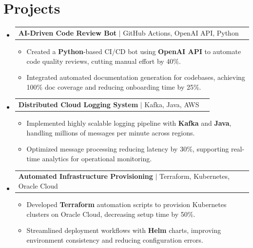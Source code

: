 \documentclass[letterpaper,11pt]{article}
\makeatletter
\newcommand{\resumeItem}[1]{
  \item\footnotesize{
    {#1 \vspace{-2pt}}
  }
}
\newcommand{\resumeProjectHeading}[2]{
    \item
    \begin{tabular*}{1.001\textwidth}{l@{\extracolsep{\fill}}r}
      \small#1 & \textbf{\small #2}\\
    \end{tabular*}\vspace{-7pt}
}
\newcommand{\resumeSubHeadingListStart}{\begin{itemize}[leftmargin=0pt, label={}]}
\newcommand{\resumeSubHeadingListEnd}{\end{itemize}}
\newcommand{\resumeItemListStart}{\begin{itemize}[leftmargin=*]}
\newcommand{\resumeItemListEnd}{\end{itemize}\vspace{-5pt}}
\makeatother
\begin{document}
\section{Projects}
    \vspace{-5pt}
    \resumeSubHeadingListStart
      \resumeProjectHeading
          {\textbf{AI-Driven Code Review Bot} $|$ GitHub Actions, OpenAI API, Python}{}
          \resumeItemListStart
              \resumeItem{Created a \textbf{Python}-based CI/CD bot using \textbf{OpenAI API} to automate code quality reviews, cutting manual effort by 40\%.}
              \resumeItem{Integrated automated documentation generation for codebases, achieving 100\% doc coverage and reducing onboarding time by 25\%.}
          \resumeItemListEnd
          \vspace{-12pt}
      \resumeProjectHeading
          {\textbf{Distributed Cloud Logging System} $|$ Kafka, Java, AWS}{}
          \resumeItemListStart
              \resumeItem{Implemented highly scalable logging pipeline with \textbf{Kafka} and \textbf{Java}, handling millions of messages per minute across regions.}
              \resumeItem{Optimized message processing reducing latency by 30\%, supporting real-time analytics for operational monitoring.}
          \resumeItemListEnd
          \vspace{-12pt}
      \resumeProjectHeading
          {\textbf{Automated Infrastructure Provisioning} $|$ Terraform, Kubernetes, Oracle Cloud}{}
          \resumeItemListStart
              \resumeItem{Developed \textbf{Terraform} automation scripts to provision Kubernetes clusters on Oracle Cloud, decreasing setup time by 50\%.}
              \resumeItem{Streamlined deployment workflows with \textbf{Helm} charts, improving environment consistency and reducing configuration errors.}
          \resumeItemListEnd 
    \resumeSubHeadingListEnd
\end{document}
